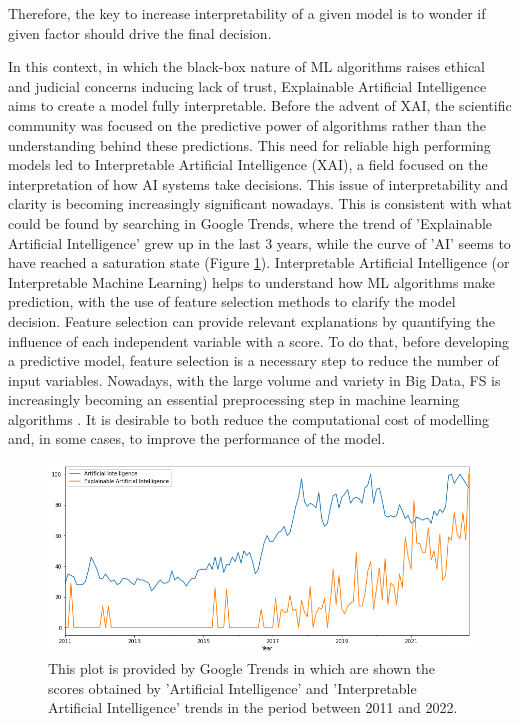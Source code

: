 Therefore, the key to increase interpretability of a given model is to wonder if given factor should drive the final decision.\par
In this context, in which the black-box nature of ML algorithms raises ethical and judicial concerns inducing lack of trust\cite{9141213}, Explainable Artificial Intelligence aims to create a model fully interpretable.
Before the advent of XAI, the scientific community was focused on the predictive power of algorithms rather than the understanding behind these predictions.
This need for reliable high performing models led to  Interpretable Artificial Intelligence (XAI), a field focused on the interpretation of how AI systems take decisions.
This issue of interpretability and clarity is becoming increasingly significant nowadays. 
This is consistent with what could be found by searching in Google Trends, where the trend of 'Explainable Artificial Intelligence' grew up in the last 3 years, while the curve of 'AI' seems to have reached a saturation state (Figure \ref{fig:AI_XAI}).
Interpretable Artificial Intelligence (or Interpretable Machine Learning) helps to understand how ML algorithms make prediction, with the use of feature selection methods to clarify the model decision.
Feature selection can provide relevant explanations by quantifying the influence of each independent variable with a score.
To do that, before developing a predictive model, feature selection is a necessary step to reduce the number of input variables. \newline
Nowadays, with the large volume and variety in Big Data, FS is increasingly becoming an essential preprocessing step in machine learning algorithms \cite{kamolov2021feature}.
It is desirable to both reduce the computational cost of modelling and, in some cases, to improve the performance of the model.\newline
\begin{figure}[H]
    \includegraphics[scale=0.50]{images/AI_XAI.png}
    \caption{This plot is provided by Google Trends in which are shown the scores obtained by 'Artificial Intelligence' and 'Interpretable Artificial Intelligence' trends in the period between 2011 and 2022.}
    \label{fig:AI_XAI}
\end{figure}
